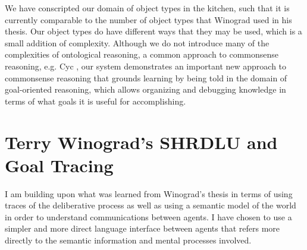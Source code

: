 We have conscripted our domain of object types in the kitchen, such
that it is currently comparable to the number of object types that
Winograd used in his thesis.  Our object types do have different ways
that they may be used, which is a small addition of complexity.
Although we do not introduce many of the complexities of ontological
reasoning, a common approach to commonsense reasoning, e.g. Cyc
\citep{lenat:1990}, our system demonstrates an important new approach
to commonsense reasoning that grounds learning by being told in the
domain of goal-oriented reasoning, which allows organizing and
debugging knowledge in terms of what goals it is useful for
accomplishing.

\section{Terry Winograd's SHRDLU and Goal Tracing}

I am building upon what was learned from Winograd's thesis
\citep{winograd:1970} in terms of using traces of the deliberative
process as well as using a semantic model of the world in order to
understand communications between agents.  I have chosen to use a
simpler and more direct language interface between agents that refers
more directly to the semantic information and mental processes
involved.

